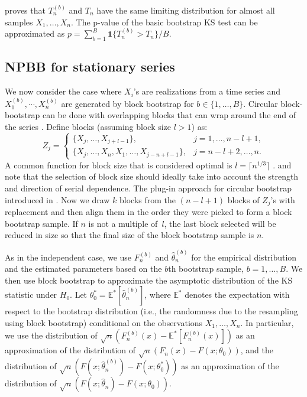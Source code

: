 \documentclass[12pt]{article}
\begin{document}
\citet{babu2004goodness} proves that $T^{(b)}_n$ and $T_n$ have the same
limiting distribution for almost all samples $X_1, \ldots, X_n$.
The p-value of the basic bootstrap KS test can be approximated
as $p = \sum_{b=1}^B \mathbf{1}\{T^{(b)}_n > T_n\} / B$.


\subsection{NPBB for stationary series}
\label{sub:npbb}

We now consider the case where $X_i$'s are realizations from a time series and
$X^{(b)}_1, \cdots ,X^{(b)}_n$ are generated by block bootstrap for
$b \in \{1, \ldots, B\}$.
Circular block-bootstrap can be done with overlapping blocks that can
wrap around the end of the series \citet{romano1992circular}.
Define blocks (assuming block size $l > 1$) as:
\begin{equation*}
Z_j =
    \begin{cases}
        \{X_j, \ldots, X_{j + l - 1}\}, & j = 1, \dots, n - l + 1,\\
        \{X_j, \ldots, X_n, X_1, \ldots, X_{j-n+l-1}\}, & j = n - l
        + 2 ,\dots, n.
    \end{cases}
\end{equation*}
A common
function for block size that is considered optimal is
$l = \lceil n^{1/3} \rceil$ \citep{buhlmann1999block}.
\citet{hall1995blocking} and
\citet{politis2004automatic} note that
the selection of block size should ideally take into account the strength
and direction of serial dependence. The plug-in approach for circular
bootstrap introduced in \citet{politis2004automatic}.
Now we draw $k$ blocks from the $(n - l + 1)$ blocks
of $Z_j$'s with replacement and then align them in the order they were picked to
form a block bootstrap sample. If $n$ is not a multiple of~$l$, the last block
selected will be reduced in size so that the final size of the block bootstrap
sample is $n$.


As in the independent case,
we use $F^{(b)}_n$ and $\hat\theta^{(b)}_n$ for the empirical distribution and
the estimated parameters based on the $b$th bootstrap sample,
$b = 1, \ldots, B$.
We then use block bootstrap to approximate the asymptotic distribution of
the KS statistic under $H_0$. Let
$\theta_0^* = \mathbb{E}^{*}[\hat\theta^{(b)}_n]$, where
$\mathbb{E}^{*}$ denotes the expectation with respect to the
bootstrap distribution (i.e., the randomness due
to the resampling using block bootstrap) conditional on the observations
$X_1, \dots, X_n$. In particular, we
use the distribution of $\sqrt{n}(F^{(b)}_n(x) - \mathbb{E}^{*}[F^{(b)}_n(x)])$
as an approximation of the distribution of
$\sqrt{n}(F_n(x) - F(x; \theta_0))$, and the distribution of
$\sqrt{n}(F(x; \hat\theta^{(b)}_n) - F(x; \theta_0^*))$ as
an approximation of the distribution of
$\sqrt{n}(F(x; \hat\theta_n) - F(x; \theta_0))$.
\end{document}

